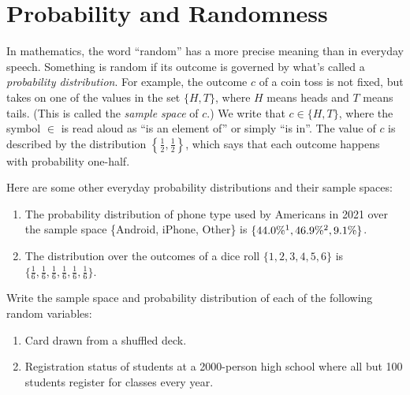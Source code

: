 \section{Probability and Randomness}\label{sec:prob}

In mathematics, the word ``random'' has a more precise meaning than in everyday 
speech. Something is random if its outcome is governed by what's called a 
\emph{probability distribution}. 
For example, the outcome $c$ of a coin toss is not fixed, but takes 
on one of the values in the set $\{H, T\}$, where $H$ means heads and $T$ means 
tails. (This is called the \emph{sample space} of $c$.) We write 
that $c \in \{H,T\}$, where the symbol $\in$ is read aloud as 
``is an element of'' or simply ``is in''.
The value of $c$ is described by the distribution $\left\{\frac{1}{2}, 
\frac{1}{2}\right\}$, which says that each outcome happens with 
probability one-half.

\begin{example}\label{ex:prob-dist}
    Here are some other everyday probability distributions and their 
    sample spaces:
    \renewcommand{\labelenumi}{(\alph{enumi})} 
    \begin{enumerate}
        \item The probability distribution of phone type used by Americans 
        in 2021 over the sample space \{Android, iPhone, Other\} is $\{44.0\%\footnotemark[1],
        46.9\%\footnotemark[2],9.1\%\}$.
        \item The distribution over the outcomes of a dice roll $\{1,2,3,4,5,6\}$
        is $\{\frac{1}{6},\frac{1}{6},\frac{1}{6},\frac{1}{6},\frac{1}{6},\frac{1}{6}\}$.
    \end{enumerate}
\end{example}

\begin{exercise}
    Write the sample space and probability distribution of each of 
    the following random variables:
    \renewcommand{\labelenumi}{(\alph{enumi})} 
    \begin{enumerate}
        \item Card drawn from a shuffled deck.
        \item Registration status of students at a 2000-person high school 
        where all but 100 students register for classes every year.
    \end{enumerate}
\end{exercise}

